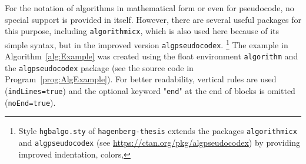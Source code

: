\noindent
For the notation of algorithms in mathematical form or even for pseudocode,
no special support is provided in \latex itself. However, there are several
useful \latex packages for this purpose, including \texttt{algorithmicx},
 which is also used here because of its simple syntax, but in the improved
version \texttt{algpseudocodex}.%
\footnote{Style \nolinkurl{hgbalgo.sty} of \texttt{hagenberg-thesis}
extends the packages \texttt{algorithmicx} and \texttt{algpseudocodex} 
(see \url{https://ctan.org/pkg/algpseudocodex}) by providing improved
indentation, colors, \etc}
%
The example in Algorithm~\ref{alg:Example} was created using the float
environment \texttt{algorithm} and the \texttt{algpseudocodex} package (see the
source code in Program~\ref{prog:AlgExample}). For better readability, vertical
rules are used (\texttt{indLines=true}) and the optional keyword 
"\texttt{end}" at the end of blocks is omitted (\texttt{noEnd=true}).



